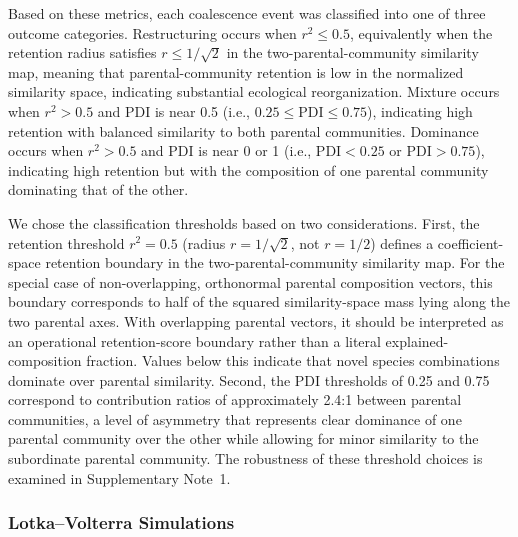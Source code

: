 Based on these metrics, each coalescence event was classified into one of three outcome categories. Restructuring occurs when $r^2 \leq 0.5$, equivalently when the retention radius satisfies $r \leq 1/\sqrt{2}$ in the two-parental-community similarity map, meaning that parental-community retention is low in the normalized similarity space, indicating substantial ecological reorganization. Mixture occurs when $r^2 > 0.5$ and PDI is near 0.5 (i.e., $0.25 \leq \text{PDI} \leq 0.75$), indicating high retention with balanced similarity to both parental communities. Dominance occurs when $r^2 > 0.5$ and PDI is near 0 or 1 (i.e., $\text{PDI} < 0.25$ or $\text{PDI} > 0.75$), indicating high retention but with the composition of one parental community dominating that of the other.

We chose the classification thresholds based on two considerations. First, the retention threshold $r^2 = 0.5$ (radius $r = 1/\sqrt{2}$, not $r = 1/2$) defines a coefficient-space retention boundary in the two-parental-community similarity map. For the special case of non-overlapping, orthonormal parental composition vectors, this boundary corresponds to half of the squared similarity-space mass lying along the two parental axes. With overlapping parental vectors, it should be interpreted as an operational retention-score boundary rather than a literal explained-composition fraction. Values below this indicate that novel species combinations dominate over parental similarity. Second, the PDI thresholds of 0.25 and 0.75 correspond to contribution ratios of approximately 2.4:1 between parental communities, a level of asymmetry that represents clear dominance of one parental community over the other while allowing for minor similarity to the subordinate parental community. The robustness of these threshold choices is examined in Supplementary Note~1.


\subsubsection*{Lotka--Volterra Simulations}
\label{sec:suppl:methods:simulations}

